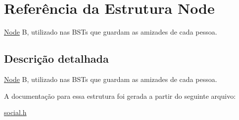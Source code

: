 \hypertarget{structNode}{}\section{Referência da Estrutura Node}
\label{structNode}


\mbox{\hyperlink{structNode}{Node}} B, utilizado nas B\+S\+Ts que guardam as amizades de cada pessoa.  




\subsection{Descrição detalhada}
\mbox{\hyperlink{structNode}{Node}} B, utilizado nas B\+S\+Ts que guardam as amizades de cada pessoa. 

A documentação para essa estrutura foi gerada a partir do seguinte arquivo\+:\begin{DoxyCompactItemize}
\item 
\mbox{\hyperlink{social_8h}{social.\+h}}\end{DoxyCompactItemize}
